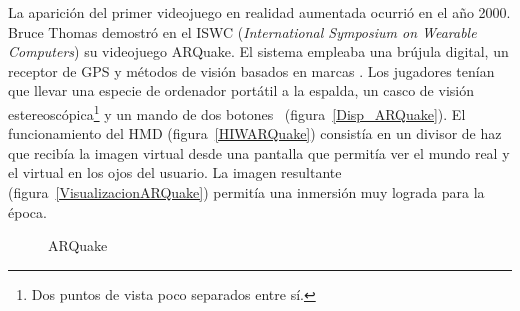 La aparición del primer videojuego en realidad aumentada ocurrió en el año 2000. Bruce Thomas demostró en el ISWC (\textit{International Symposium on Wearable Computers}) su videojuego ARQuake. El sistema empleaba una brújula digital, un receptor de GPS y métodos de visión basados en marcas \cite{ARToolkit}. Los jugadores tenían que llevar una especie de ordenador portátil a la espalda, un casco de visión estereoscópica\footnote{ Dos puntos de vista poco separados entre sí.} y un mando de dos botones~\cite{ARQuake} (figura~\ref{Disp_ARQuake}). El funcionamiento del HMD (figura~\ref{HIWARQuake}) consistía en un divisor de haz que recibía la imagen virtual desde una pantalla que permitía ver el mundo real y el virtual en los ojos del usuario. La imagen resultante (figura~\ref{VisualizacionARQuake}) permitía una inmersión muy lograda para la época.

\begin{figure}[H]
\centering
{}
\caption[ARQuake]{ARQuake~\cite{ARQuake}}\label{fig:ARQuakeFig}
\end{figure}



